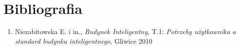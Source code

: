 \chapter{Bibliografia}

\vspace*{1cm}

\begin{enumerate}[\lbrack 1\rbrack]
	\item Niezabitowska E. i in., \textit{Budynek Inteligentny}, T.1: \textit{Potrzeby użytkownika a standard budynku inteligentnego}, Gliwice 2010
\end{enumerate}

